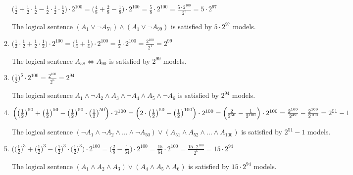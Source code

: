 \begin{enumerate}
\begin{enumerate}
$\big(\frac{1}{2} + \frac{1}{2} \cdot \frac{1}{2} - \frac{1}{2} \cdot \frac{1}{2} \cdot \frac{1}{2}\big) \cdot 2^{100} =
\big(\frac{4}{8} + \frac{2}{8} - \frac{1}{8}\big) \cdot 2^{100} =
\frac{5}{8} \cdot 2^{100} =
\frac{5 \cdot 2^{100}}{2^3} =
5 \cdot 2^{97}$

The logical sentence $(A_{1} \lor \neg A_{57}) \land (A_{1} \lor \neg A_{99})$ is satisfied by $5 \cdot 2^{97}$ models.

\item
$\big(\frac{1}{2} \cdot \frac{1}{2} + \frac{1}{2} \cdot \frac{1}{2}\big) \cdot 2^{100} =
\big(\frac{1}{4} + \frac{1}{4}\big) \cdot 2^{100} =
\frac{1}{2} \cdot 2^{100} =
\frac{2^{100}}{2^1} =
2^{99}$

The logical sentence $A_{58} \Leftrightarrow A_{90}$ is satisfied by $2^{99}$ models.

\item
$\big(\frac{1}{2}\big)^{6} \cdot 2^{100} =
\frac{2^{100}}{2^6} =
2^{94}$

The logical sentence $A_1 \land \neg A_2 \land A_3 \land \neg A_4 \land A_5 \land \neg A_6$ is satisfied by $2^{94}$ models.

\item
$\Big(\big(\frac{1}{2}\big)^{50} + \big(\frac{1}{2}\big)^{50} - \big(\frac{1}{2}\big)^{50} \cdot \big(\frac{1}{2}\big)^{50}\Big) \cdot 2^{100} =
\Big(2 \cdot \big(\frac{1}{2}\big)^{50} - \big(\frac{1}{2}\big)^{100}\Big) \cdot 2^{100} = \\
\Big(\frac{2}{2^{50}} - \frac{1}{2^{100}}\Big) \cdot 2^{100} =
\frac{2^{100}}{2^{49}} - \frac{2^{100}}{2^{100}} =
2^{51} - 1$

The logical sentence $(\neg A_1 \land \neg A_2 \land \ldots \land \neg A_{50}) \lor (A_{51} \land A_{52} \land \ldots \land A_{100})$ is satisfied by $2^{51} - 1$ models.

\item
$\Big(\big(\frac{1}{2}\big)^3 + \big(\frac{1}{2}\big)^3 - \big(\frac{1}{2}\big)^3 \cdot \big(\frac{1}{2}\big)^3\Big) \cdot 2^{100} =
\big(\frac{2}{8} - \frac{1}{64}\big) \cdot 2^{100} =
\frac{15}{64} \cdot 2^{100} =
\frac{15 \cdot 2^{100}}{2^6} =
15 \cdot 2^{94}$

The logical sentence $(A_1 \land A_2 \land A_3) \lor (A_4 \land A_5 \land A_6)$ is satisfied by $15 \cdot 2^{94}$ models.

\end{enumerate}

\end{enumerate}

